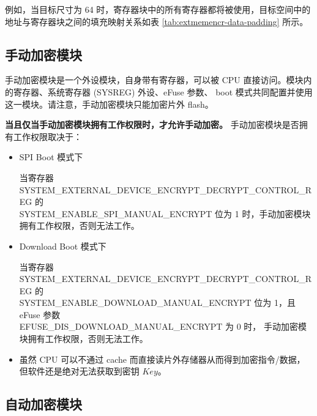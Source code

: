 \documentclass[main\_\_CN.tex]{subfiles}
\begin{document}
例如，当目标尺寸为 64 时，寄存器块中的所有寄存器都将被使用，目标空间中的地址与寄存器块之间的填充映射关系如表 \ref{tab:extmemencr-data-padding} 所示。



\subsection{手动加密模块}

手动加密模块是一个外设模块，自身带有寄存器，可以被 CPU 直接访问。模块内的寄存器、系统寄存器 (SYSREG) 外设、eFuse 参数、 boot 模式共同配置并使用这一模块。请注意，手动加密模块只能加密片外 flash。

\textbf{ 当且仅当手动加密模块拥有工作权限时，才允许手动加密。}  手动加密模块是否拥有工作权限取决于：

\begin{itemize}

    \item SPI Boot 模式下

    当寄存器 SYSTEM\_EXTERNAL\_DEVICE\_ENCRYPT\_DECRYPT\_CONTROL\_REG 的 \\ SYSTEM\_ENABLE\_SPI\_MANUAL\_ENCRYPT 位为 1 时，手动加密模块拥有工作权限，否则无法工作。

    \item Download Boot 模式下

    当寄存器 SYSTEM\_EXTERNAL\_DEVICE\_ENCRYPT\_DECRYPT\_CONTROL\_REG 的\\ SYSTEM\_ENABLE\_DOWNLOAD\_MANUAL\_ENCRYPT 位为 1，且 eFuse 参数\\ EFUSE\_DIS\_DOWNLOAD\_MANUAL\_ENCRYPT 为 0 时，
    手动加密模块拥有工作权限，否则无法工作。

\end{itemize}

\begin{tiplisting}
\vspace{-2em}
\begin{itemize}
\item 虽然 CPU 可以不通过 cache 而直接读片外存储器从而得到加密指令/数据，
但软件还是绝对无法获取到密钥 \begin{math}Key\end{math}。
\end{itemize}
\end{tiplisting}

\subsection{自动加密模块}
\end{document}
